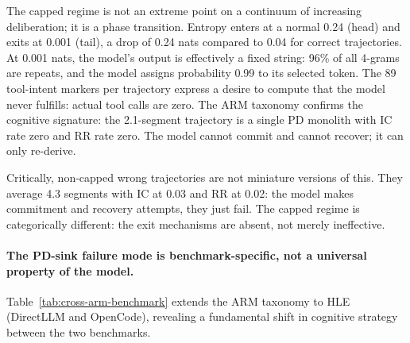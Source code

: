 
The capped regime is not an extreme point on a continuum of increasing
deliberation; it is a phase transition.
Entropy enters at a normal 0.24 (head) and exits at 0.001 (tail), a drop of
0.24 nats compared to 0.04 for correct trajectories.
At 0.001 nats, the model's output is effectively a fixed string: 96\% of
all 4-grams are repeats, and the model assigns probability 0.99 to its
selected token.
The 89 tool-intent markers per trajectory express a desire to compute that
the model never fulfills: actual tool calls are zero.
The ARM taxonomy confirms the cognitive signature: the 2.1-segment trajectory
is a single PD monolith with IC rate zero and RR rate zero.
The model cannot commit and cannot recover; it can only re-derive.

Critically, non-capped wrong trajectories are not miniature versions of this.
They average 4.3 segments with IC at 0.03 and RR at 0.02: the model makes
commitment and recovery attempts, they just fail.
The capped regime is categorically different: the exit mechanisms are absent,
not merely ineffective.

\paragraph{The PD-sink failure mode is benchmark-specific, not a universal
property of the model.}

Table~\ref{tab:cross-arm-benchmark} extends the ARM taxonomy to HLE
(DirectLLM and OpenCode), revealing a fundamental shift in cognitive strategy
between the two benchmarks.

